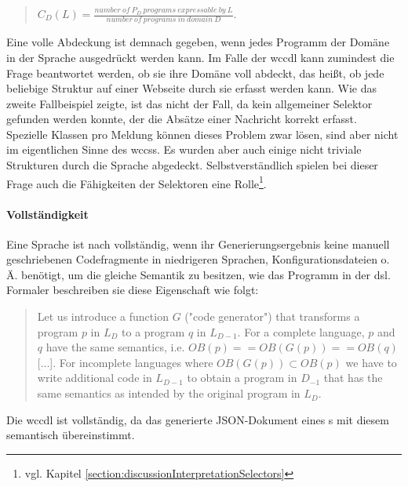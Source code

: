     \begin{quote}
        $C_D(L) = \frac{number\ of\ P_D\ programs\ expressable\ by\ L}{number\ of\ programs\ in\ domain\ D}$.
    \end{quote}

    Eine volle Abdeckung ist demnach gegeben,
    wenn jedes Programm der Domäne in der Sprache ausgedrückt werden kann.
    Im Falle der \gls{wccdl} kann zumindest die Frage beantwortet werden,
    ob sie ihre Domäne voll abdeckt, das heißt, ob jede beliebige Struktur auf einer Webseite
    durch sie erfasst werden kann.
    Wie das zweite Fallbeispiel zeigte, ist das nicht der Fall,
    da kein allgemeiner Selektor gefunden werden konnte,
    der die Absätze einer Nachricht korrekt erfasst.
    Spezielle Klassen pro Meldung können dieses Problem zwar lösen,
    sind aber nicht im eigentlichen Sinne des \glspl{wccs}.
    Es wurden aber auch einige nicht triviale Strukturen durch die Sprache abgedeckt.
    Selbstverständlich spielen bei dieser Frage auch die Fähigkeiten der Selektoren
    eine Rolle\footnote{vgl. Kapitel \ref{section:discussionInterpretationSelectors}}.

    \paragraph{Vollständigkeit}
    Eine Sprache ist nach \citet[Kapitel 4.5]{voelter:DslEngineering}
    vollständig, wenn ihr Generierungsergebnis keine manuell geschriebenen Codefragmente in niedrigeren Sprachen,
    Konfigurationsdateien o. Ä. benötigt,
    um die gleiche Semantik zu besitzen, wie das Programm in der \gls{dsl}.
    Formaler beschreiben sie diese Eigenschaft wie folgt:

    \begin{quote}
        Let us introduce a function $G$ ("code generator") that transforms
        a program $p$ in $L_D$ to a program $q$ in $L_{D-1}$.
        For a complete language, $p$ and $q$ have the same semantics, i.e.
        $OB(p) == OB(G(p)) == OB(q)$ [...]. For incomplete languages
        where $OB(G(p)) \subset OB(p)$ we have to write additional
        code in $L_{D-1}$ to obtain a program in $D_{-1}$ that has the same semantics
        as intended by the original program in $L_D$.
    \end{quote}

    Die \gls{wccdl} ist vollständig, da das generierte JSON-Dokument eines
    {\classificationModel}s mit diesem semantisch übereinstimmt.

